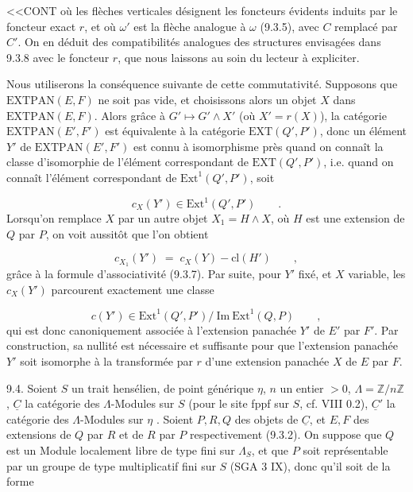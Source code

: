 
<<CONT où les flèches verticales désignent les foncteurs évidents induits par le foncteur exact $r$, et où $\omega'$ est la flèche analogue à $\omega$ (9.3.5), avec $C$ remplacé par $C'$. On en déduit des compatibilités analogues des structures envisagées dans 9.3.8 avec le foncteur $r$, que nous laissons au soin du lecteur à expliciter.

Nous utiliserons la conséquence suivante de cette commutativité. Supposons que $\mathrm{EXTPAN}(E,F)$ ne soit pas vide, et choisissons alors un objet $X$ dans $\mathrm{EXTPAN}(E,F)$. Alors grâce à $G' \longmapsto G' \wedge X'$ (où $X'=r(X)$), la catégorie $\mathrm{EXTPAN}(E',F')$ est équivalente à la catégorie $\mathrm{EXT}(Q',P')$, donc un élément $Y'$ de $\mathrm{EXTPAN}(E',F')$ est connu à isomorphisme près quand on connaît la classe d'isomorphie de l'élément correspondant de $\mathrm{EXT}(Q',P')$, i.e. quand on connaît l'élément correspondant de $\mathrm{Ext}^1(Q' ,P')$, soit

\begin{equation*}
c_X(Y') \in \mathrm{Ext}^1(Q',P') \qquad .
\end{equation*}
Lorsqu'on remplace $X$ par un autre objet $X_1 = H \wedge X$, où $H$ est une extension de $Q$ par $P$, on voit aussitôt que l'on obtient

\begin{equation*}
c_{X_1}(Y') \;=\; c_X(Y) - \mathrm{cl}(H') \qquad ,
\end{equation*}
grâce à la formule d'associativité (9.3.7). Par suite, pour $Y'$ fixé, et $X$ variable, les $c_X(Y')$ parcourent exactement une classe

\begin{equation}\tag{9.3.13}
c(Y') \in \mathrm{Ext}^1(Q',P')/\ \mathrm{Im}\ \mathrm{Ext}^1(Q,P) \qquad ,
\end{equation}
qui est donc canoniquement associée à l'extension panachée $Y'$ de $E'$ par $F'$. Par construction, sa nullité est nécessaire et suffisante pour que l'extension panachée $Y'$ soit isomorphe à la transformée par $r$ d'une extension panachée $X$ de $E$ par $F$.



9.4. Soient $S$ un trait hensélien, de point générique $\eta$, $n$ un entier $> 0$, $\Lambda = \mathbb{Z}/n\mathbb{Z}$ , $\underline{C}$ la catégorie des $\Lambda$-Modules sur $S$ (pour le site fppf sur $S$, cf. VIII 0.2), $\underline{C}'$ la catégorie des $\Lambda$-Modules sur $\eta$ . Soient $P,R,Q$ des objets de $\underline{C}$, et $E,F$ des extensions de $Q$ par $R$ et de $R$ par $P$ respectivement (9.3.2). On suppose que $Q$ est un Module localement libre de type fini sur $\Lambda_S$, et que $P$ soit représentable par un groupe de type multiplicatif fini sur $S$ (SGA 3 IX), donc qu'il soit de la forme

